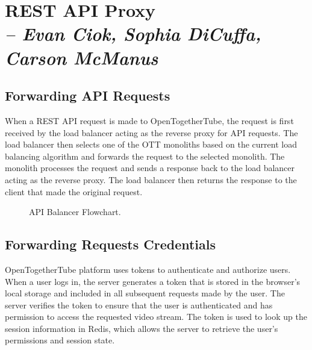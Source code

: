 \chapter{REST API Proxy \\
  \small{\textit{-- Evan Ciok, Sophia DiCuffa, Carson McManus}}
  \label{Chapter::RestApiProxy}}

\section{Forwarding API Requests}
When a REST API request is made to OpenTogetherTube, the request is first received by the load balancer
 acting as the reverse proxy for API requests. The load balancer then selects one of the OTT monoliths based
  on the current load balancing algorithm and forwards the request to the selected monolith. The monolith processes 
  the request and sends a response back to the load balancer acting as the reverse proxy. The load balancer then returns 
  the response to the client that made the original request.

\begin{figure}[!htb]
  \centering
  \caption{\label{Figure::api-balancer} API Balancer Flowchart.}
\end{figure}

\section{Forwarding Requests Credentials}

OpenTogetherTube platform uses tokens to authenticate and authorize users. When a user logs in, the
server generates a token that is stored in the browser's local storage and included in all subsequent requests made
by the user. The server verifies the token to ensure that the user is authenticated and has permission to access the
requested video stream. The token is used to look up the session information in Redis, which allows the server to 
retrieve the user's permissions and session state.

